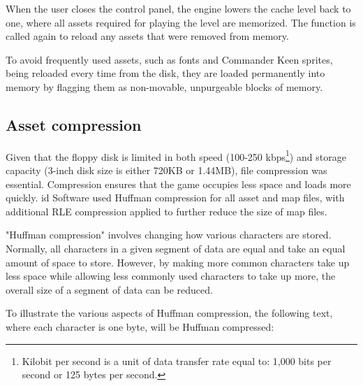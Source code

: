 \documentclass[book.tex]{subfiles}
\begin{document}


\par
When the user closes the control panel, the engine lowers the cache level back to one, where all assets required for playing the level are memorized. The function  is called again to reload any assets that were removed from memory.\\

\pagebreak

\par
To avoid frequently used assets, such as fonts and Commander Keen sprites, being reloaded every time from the disk, they are loaded permanently into memory by flagging them as non-movable, unpurgeable blocks of memory. \\

\par

\par
 
\pagebreak
\subsection{Asset compression}
Given that the floppy disk is limited in both speed (100-250 kbps\footnote{Kilobit per second is a unit of data transfer rate equal to: 1,000 bits per second or 125 bytes per second.}) and storage capacity (3-inch disk size is either 720KB or 1.44MB), file compression was essential. Compression ensures that the game occupies less space and loads more quickly. id Software used Huffman compression for all asset and map files, with additional RLE compression applied to further reduce the size of map files.\\


\par
"Huffman compression" involves changing how various characters are stored. Normally, all characters in a given segment of data are equal and take an equal amount of space to store. However, by making more common characters take up less space while allowing less commonly used characters to take up more, the overall size of a segment of data can be reduced. \\


\par
To illustrate the various aspects of Huffman compression, the following text, where each character is one byte, will be Huffman compressed: \\
\end{document}
